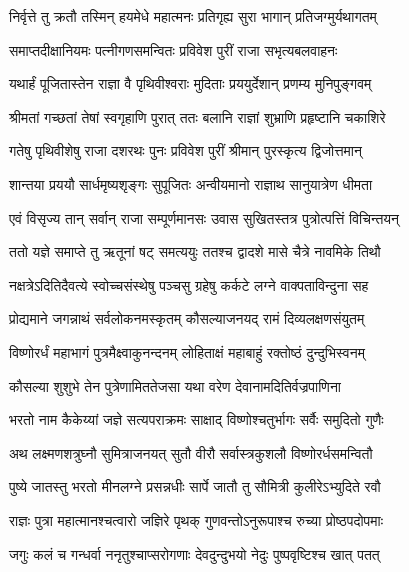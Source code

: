 
\twolineshloka
{निर्वृत्ते तु क्रतौ तस्मिन् हयमेधे महात्मनः}
{प्रतिगृह्य सुरा भागान् प्रतिजग्मुर्यथागतम्} %

\twolineshloka
{समाप्तदीक्षानियमः पत्नीगणसमन्वितः}
{प्रविवेश पुरीं राजा सभृत्यबलवाहनः} %

\twolineshloka
{यथार्हं पूजितास्तेन राज्ञा वै पृथिवीश्वराः}
{मुदिताः प्रययुर्देशान् प्रणम्य मुनिपुङ्गवम्} %

\twolineshloka
{श्रीमतां गच्छतां तेषां स्वगृहाणि पुरात् ततः}
{बलानि राज्ञां शुभ्राणि प्रहृष्टानि चकाशिरे} %

\twolineshloka
{गतेषु पृथिवीशेषु राजा दशरथः पुनः}
{प्रविवेश पुरीं श्रीमान् पुरस्कृत्य द्विजोत्तमान्} %

\twolineshloka
{शान्तया प्रययौ सार्धमृष्यशृङ्गः सुपूजितः}
{अन्वीयमानो राज्ञाथ सानुयात्रेण धीमता} %

\twolineshloka
{एवं विसृज्य तान् सर्वान् राजा सम्पूर्णमानसः}
{उवास सुखितस्तत्र पुत्रोत्पत्तिं विचिन्तयन्} %

\twolineshloka
{ततो यज्ञे समाप्ते तु ऋतूनां षट् समत्ययुः}
{ततश्च द्वादशे मासे चैत्रे नावमिके तिथौ} %

\twolineshloka
{नक्षत्रेऽदितिदैवत्ये स्वोच्चसंस्थेषु पञ्चसु}
{ग्रहेषु कर्कटे लग्ने वाक्पताविन्दुना सह} %

\twolineshloka
{प्रोद्यमाने जगन्नाथं सर्वलोकनमस्कृतम्}
{कौसल्याजनयद् रामं दिव्यलक्षणसंयुतम्} %

\twolineshloka
{विष्णोरर्धं महाभागं पुत्रमैक्ष्वाकुनन्दनम्}
{लोहिताक्षं महाबाहुं रक्तोष्ठं दुन्दुभिस्वनम्} %

\twolineshloka
{कौसल्या शुशुभे तेन पुत्रेणामिततेजसा}
{यथा वरेण देवानामदितिर्वज्रपाणिना} %

\twolineshloka
{भरतो नाम कैकेय्यां जज्ञे सत्यपराक्रमः}
{साक्षाद् विष्णोश्चतुर्भागः सर्वैः समुदितो गुणैः} %

\twolineshloka
{अथ लक्ष्मणशत्रुघ्नौ सुमित्राजनयत् सुतौ}
{वीरौ सर्वास्त्रकुशलौ विष्णोरर्धसमन्वितौ} %

\twolineshloka
{पुष्ये जातस्तु भरतो मीनलग्ने प्रसन्नधीः}
{सार्पे जातौ तु सौमित्री कुलीरेऽभ्युदिते रवौ} %

\twolineshloka
{राज्ञः पुत्रा महात्मानश्चत्वारो जज्ञिरे पृथक्}
{गुणवन्तोऽनुरूपाश्च रुच्या प्रोष्ठपदोपमाः} %

\twolineshloka
{जगुः कलं च गन्धर्वा ननृतुश्चाप्सरोगणाः}
{देवदुन्दुभयो नेदुः पुष्पवृष्टिश्च खात् पतत्} %


